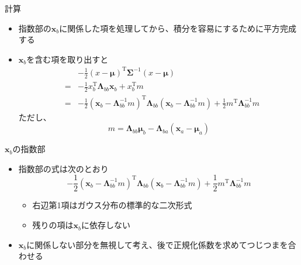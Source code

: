 \begin{frame}{計算}
 \begin{itemize}
  \item 指数部の$\bm{x}_b$に関係した項を処理してから、積分を容易にするために平方完成する
  \item $\bm{x}_b$を含む項を取り出すと
        \begin{eqnarray*}
         && -\frac{1}{2}(x - \bm{\mu})^{\mathrm{T}}\bm{\Sigma}^{-1}(x-\bm{\mu}) \\
         &=&-\frac{1}{2}x^{\mathrm{T}}_b\bm{\Lambda}_{bb}\bm{x}_b+x^{\mathrm{T}}_bm \\
         &=& -\frac{1}{2}(\bm{x}_b-\bm{\Lambda}_{bb}^{-1}m)^{\mathrm{T}}\bm{\Lambda}_{bb}(\bm{x}_b-\bm{\Lambda}_{bb}^{-1}m) + \frac{1}{2}m^{\mathrm{T}}\bm{\Lambda}_{bb}^{-1}m
        \end{eqnarray*}
        ただし、
        \begin{equation*}
         m =  \bm{\Lambda}_{bb}\bm{\mu}_b - \bm{\Lambda}_{ba}(\bm{x}_a-\bm{\mu}_a)
        \end{equation*}
 \end{itemize}
\end{frame}

\begin{frame}{$\bm{x}_b$の指数部}
 \begin{itemize}
  \item 指数部の式は次のとおり
        \begin{equation}
         -\frac{1}{2}(\bm{x}_b-\bm{\Lambda}_{bb}^{-1}m)^{\mathrm{T}}\bm{\Lambda}_{bb}(\bm{x}_b-\bm{\Lambda}_{bb}^{-1}m) + \frac{1}{2}m^{\mathrm{T}}\bm{\Lambda}_{bb}^{-1}m
        \end{equation}
        \begin{itemize}
         \item 右辺第1項はガウス分布の標準的な二次形式
         \item 残りの項は$\bm{x}_b$に依存しない
        \end{itemize}
  \item $\bm{x}_b$に関係しない部分を無視して考え、後で正規化係数を求めてつじつまを合わせる
 \end{itemize}
\end{frame}


